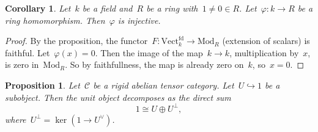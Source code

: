 \documentclass[a4paper,english,12pt]{scrartcl}
\theoremstyle{definition}
\theoremstyle{plain}
\newtheorem{prop}[defn]{Proposition}
\newtheorem{cor}[defn]{Corollary}
\theoremstyle{remark}
\newcommand{\C}{\mathcal{C}}
\renewcommand{\_}{\mathpunct{.}\,}
\newcommand{\?}{\,{:}\,}
\newcommand{\Mod}{\mathrm{Mod}}
\newcommand{\Vect}{\mathrm{Vect}}
\begin{document}
\begin{cor}Let~$k$ be a field and~$R$ be a ring with~$1 \neq 0 \in R$.
Let~$\varphi : k \to R$ be a ring homomorphism. Then~$\varphi$ is
injective.\end{cor}
\begin{proof}By the proposition, the functor~$F : \Vect_k^\text{fd} \to
\Mod_R$ (extension of scalars) is faithful. Let~$\varphi(x) = 0$. Then the
image of the map~$k \to k$, multiplication by~$x$, is zero in~$\Mod_R$. So by
faithfullness, the map is already zero on~$k$, so~$x = 0$.\end{proof}

\begin{prop}Let~$\C$ be a rigid abelian tensor category. Let~$U \hookrightarrow
1$ be a subobject. Then the unit object decomposes as the direct sum
\[ 1 \cong U \oplus U^\perp, \]
where~$U^\perp = \ker(1 \to U^\vee)$.\end{prop}
\end{document}
